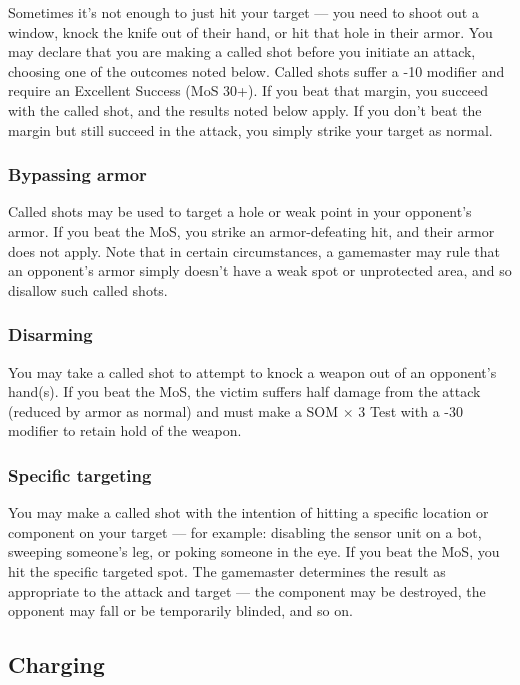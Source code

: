Sometimes it’s not enough to just hit your target --- you need to shoot out a window, knock the knife out of their hand, or hit that hole in their armor. You may declare that you are making a called shot before you initiate an attack, choosing one of the outcomes noted below. Called shots suffer a -10 modifier and require an Excellent Success (MoS 30+). If you beat that margin, you succeed with the called shot, and the results noted below apply. If you don’t beat the margin but still succeed in the attack, you simply strike your target as normal.

\subsubsection{Bypassing armor}

Called shots may be used to target a hole or weak point in your opponent’s armor. If you beat the MoS, you strike an armor-defeating hit, and their armor does not apply. Note that in certain circumstances, a gamemaster may rule that an opponent’s armor simply doesn’t have a weak spot or unprotected area, and so disallow such called shots.

\subsubsection{Disarming}

You may take a called shot to attempt to knock a weapon out of an opponent’s hand(s). If you beat the MoS, the victim suffers half damage from the attack (reduced by armor as normal) and must make a SOM $\times$ 3 Test with a -30 modifier to retain hold of the weapon.

\subsubsection{Specific targeting}

You may make a called shot with the intention of hitting a specific location or component on your target --- for example: disabling the sensor unit on a bot, sweeping someone’s leg, or poking someone in the eye. If you beat the MoS, you hit the specific targeted spot. The gamemaster determines the result as appropriate to the attack and target --- the component may be destroyed, the opponent may fall or be temporarily blinded, and so on.

\subsection{Charging}
\label{sec:charging}

